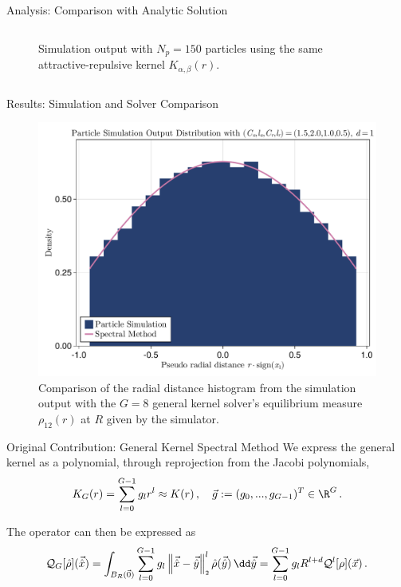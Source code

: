 \documentclass[aspectratio=169, hyperref={colorlinks=true}]{beamer}
\begin{document}
\begin{frame}{Analysis: Comparison with Analytic Solution}
\begin{columns}
\begin{column}{0.4\textwidth}
\begin{figure}[H]
          \caption[Comparison with analytical solutions and error]{Simulation output with $N_p = 150$ particles using the same attractive-repulsive kernel $K_{\alpha,\beta}(r)$.}
        \end{figure}
      \end{column}
    \end{columns}
  \end{frame}
  \begin{frame}{Results: Simulation and Solver Comparison}
    \begin{figure}[H]
      \centering
      \includegraphics[width=0.6\linewidth]{results/morse/simulation-solver-comparison.pdf}
      \caption[Comparison of histogram and spectral method solution]{Comparison of the radial distance histogram from the simulation output with the $G = 8$ general kernel solver's equilibrium measure $\rho_{12}(r)$ at $R$ given by the simulator.}
      \label{fig:simulation-solver-comparison}
    \end{figure}
  \end{frame}

  \begin{frame}{Original Contribution: General Kernel Spectral Method}
    We express the general kernel as a polynomial, through reprojection from the Jacobi polynomials,
    \begin{equation}
      K_G(r) = \sum_{l=0}^{G-1} g_l r^l \approx K(r)\,,\quad \vec{g} := ({g}_0, ..., {g}_{G-1})^T \in \R^G\,.
      \label{eq:monomial-expansion}
    \end{equation}

    The operator can then be expressed as
    \begin{equation*}
      \mathcal{Q}_G[\hat{\rho}](\hatvec{x})
      = \int_{B_R(\vec{0})} \sum_{l=0}^{G-1} g_l \norm{\hatvec{x}-\hatvec{y}}^l \hat{\rho}(\hatvec{y}) \,\dd\hatvec{y}
      = \sum_{l=0}^{G-1} g_l R^{l+d} \mathcal{Q}^l[\rho](\vec{x})\,.
    \end{equation*}
  \end{frame}
\end{document}
